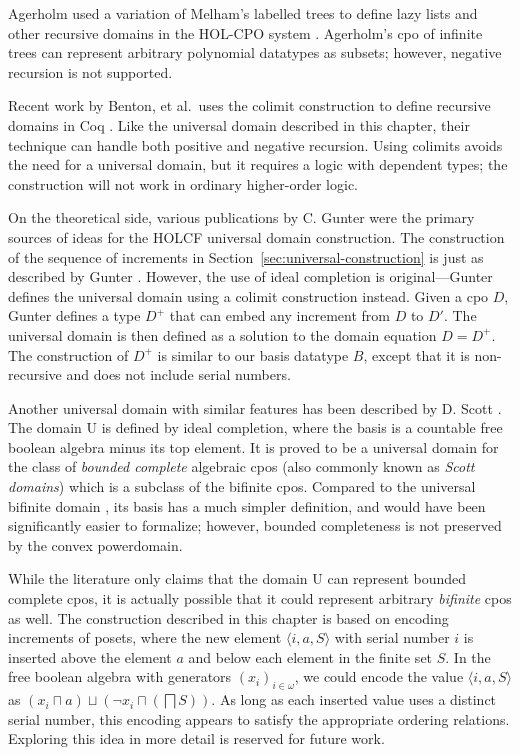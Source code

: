 Agerholm used a variation of Melham's labelled trees to define lazy lists and other recursive domains in the HOL-CPO system \cite{agerholm94thesis}. Agerholm's cpo of infinite trees can represent arbitrary polynomial datatypes as subsets; however, negative recursion is not supported.

Recent work by Benton, et al.\ uses the colimit construction to define recursive domains in Coq \cite{bkv2009coq}. Like the universal domain described in this chapter, their technique can handle both positive and negative recursion. Using colimits avoids the need for a universal domain, but it requires a logic with dependent types; the construction will not work in ordinary higher-order logic.

On the theoretical side, various publications by C. Gunter \cite{gunter85thesis, gunter87universal, gunter92semantics} were the primary sources of ideas for the HOLCF universal domain construction. The construction of the sequence of increments in Section~\ref{sec:universal-construction} is just as described by Gunter \cite[\S5]{gunter87universal}. However, the use of ideal completion is original---Gunter defines the universal domain using a colimit construction instead. Given a cpo $D$, Gunter defines a type $D^+$ that can embed any increment from $D$ to $D'$. The universal domain is then defined as a solution to the domain equation $D = D^+$. The construction of $D^+$ is similar to our basis datatype $B$, except that it is non-recursive and does not include serial numbers.

Another universal domain with similar features has been described by D. Scott \cite{gunter90semantic, Scott08}. The domain \textsf{U} is defined by ideal completion, where the basis is a countable free boolean algebra minus its top element. It is proved to be a universal domain for the class of \emph{bounded complete} algebraic cpos (also commonly known as \emph{Scott domains}) which is a subclass of the bifinite cpos. Compared to the universal bifinite domain , its basis has a much simpler definition, and would have been significantly easier to formalize; however, bounded completeness is not preserved by the convex powerdomain.

While the literature only claims that the domain \textsf{U} can represent bounded complete cpos, it is actually possible that it could represent arbitrary \emph{bifinite} cpos as well. The construction described in this chapter is based on encoding increments of posets, where the new element $\langle i, a, S \rangle$ with serial number $i$ is inserted above the element $a$ and below each element in the finite set $S$. In the free boolean algebra with generators $(x_i)_{i\in\omega}$, we could encode the value $\langle i, a, S \rangle$ as $(x_i \sqcap a) \sqcup (\neg x_i \sqcap (\bigsqcap S))$. As long as each inserted value uses a distinct serial number, this encoding appears to satisfy the appropriate ordering relations. Exploring this idea in more detail is reserved for future work.

